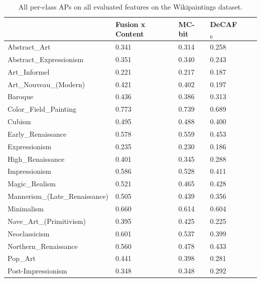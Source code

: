 \begin{table}[ht!]
\centering
\caption{
    All per-class APs on all evaluated features on the Wikipaintings dataset.
}\label{tab:wikipaintings_ap_table}
\vspace{1em}
\begin{tabular}{llllll}
\toprule
{}                             & Fusion x Content & MC-bit & DeCAF$_6$  \\
\midrule
Abstract\_Art                  & 0.341            & 0.314  & 0.258      \\
Abstract\_Expressionism        & 0.351            & 0.340  & 0.243      \\
Art\_Informel                  & 0.221            & 0.217  & 0.187      \\
Art\_Nouveau\_(Modern)         & 0.421            & 0.402  & 0.197      \\
Baroque                        & 0.436            & 0.386  & 0.313      \\
Color\_Field\_Painting         & 0.773            & 0.739  & 0.689      \\
Cubism                         & 0.495            & 0.488  & 0.400      \\
Early\_Renaissance             & 0.578            & 0.559  & 0.453      \\
Expressionism                  & 0.235            & 0.230  & 0.186      \\
High\_Renaissance              & 0.401            & 0.345  & 0.288      \\
Impressionism                  & 0.586            & 0.528  & 0.411      \\
Magic\_Realism                 & 0.521            & 0.465  & 0.428      \\
Mannerism\_(Late\_Renaissance) & 0.505            & 0.439  & 0.356      \\
Minimalism                     & 0.660            & 0.614  & 0.604      \\
Nave\_Art\_(Primitivism)       & 0.395            & 0.425  & 0.225      \\
Neoclassicism                  & 0.601            & 0.537  & 0.399      \\
Northern\_Renaissance          & 0.560            & 0.478  & 0.433      \\
Pop\_Art                       & 0.441            & 0.398  & 0.281      \\
Post-Impressionism             & 0.348            & 0.348  & 0.292      \\

\end{tabular}
\end{table}
